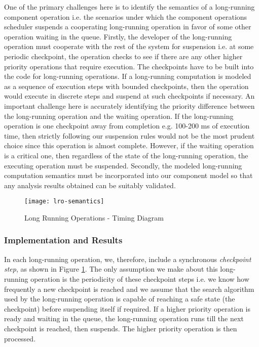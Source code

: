 One of the primary challenges here is to identify the semantics of a long-running component operation i.e. the scenarios under which the component operations scheduler suspends a cooperating long-running operation in favor of some other operation waiting in the queue. Firstly, the developer of the long-running operation must cooperate with the rest of the system for suspension i.e. at some periodic checkpoint, the operation checks to see if there are any other higher priority operations that require execution. The checkpoints have to be built into the code for long-running operations. If a long-running computation is modeled as a sequence of execution steps with bounded checkpoints, then the operation would execute in discrete steps and suspend at such checkpoints if necessary. An important challenge here is accurately identifying the priority difference between the long-running operation and the waiting operation. If the long-running operation is one checkpoint away from completion e.g. 100-200 ms of execution time, then strictly following our suspension rules would not be the most prudent choice since this operation is almost complete. However, if the waiting operation is a critical one, then regardless of the state of the long-running operation, the executing operation must be suspended. Secondly, the modeled long-running computation semantics must be incorporated into our component model so that any analysis results obtained can be suitably validated. 

\begin{figure}[h]
	\centering
	\texttt{[image: lro-semantics]}
	\caption{Long Running Operations - Timing Diagram}
	\label{fig:lro-semantics}
\end{figure}
\FloatBarrier

\subsubsection{Implementation and Results}

In each long-running operation, we, therefore, include a synchronous \emph{checkpoint step}, as shown in Figure \ref{fig:lro-semantics}. The only assumption we make about this long-running operation is the periodicity of these checkpoint steps i.e. we know how frequently a new checkpoint is reached and we assume that the search algorithm used by the long-running operation is capable of reaching a safe state (the checkpoint) before suspending itself if required. If a higher priority operation is ready and waiting in the queue, the long-running operation runs till the next checkpoint is reached, then suspends. The higher priority operation is then processed. 

